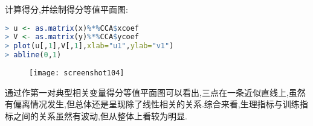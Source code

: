 \documentclass[11pt,a4paper,oneside]{book}
\begin{document}
计算得分,并绘制得分等值平面图:
\begin{lstlisting}[language=r]
> u <- as.matrix(x)%*%CCA$xcoef
> V <- as.matrix(y)%*%CCA$ycoef
> plot(u[,1],V[,1],xlab="u1",ylab="v1")
> abline(0,1)
\end{lstlisting}
\begin{figure}[H]
	\centering
	\texttt{[image: screenshot104]}
\end{figure}
通过作第一对典型相关变量得分等值平面图可以看出,三点在一条近似直线上,虽然有偏离情况发生,但总体还是呈现除了线性相关的关系.综合来看,生理指标与训练指标之间的关系虽然有波动,但从整体上看较为明显.
\end{document}
